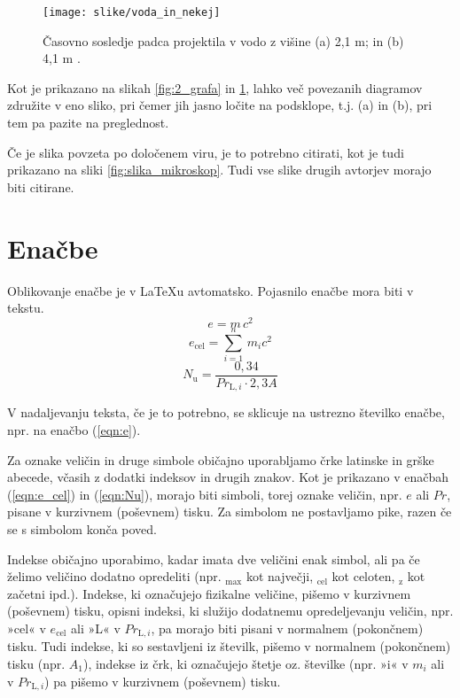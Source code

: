 \begin{figure}[ht!]
	\begin{centering}
		\texttt{[image: slike/voda\_in\_nekej]}
		\caption{Časovno sosledje padca projektila v vodo z višine (a) 2,1 m; in (b) 4,1 m \cite{bazant_1991}.} \label{fig:voda_in_nekej}
	\end{centering}
\end{figure}

Kot je prikazano na slikah \ref{fig:2_grafa} in \ref{fig:voda_in_nekej}, lahko več povezanih diagramov združite v eno sliko, pri čemer jih jasno ločite na podsklope, t.j. (a) in (b), pri tem pa pazite na preglednost.

Če je slika povzeta po določenem viru, je to potrebno citirati, kot je tudi prikazano na sliki \ref{fig:slika_mikroskop}. Tudi vse slike drugih avtorjev morajo biti citirane.

\section{Enačbe}\label{sec:enacbe}

Oblikovanje enačbe je v \LaTeX u avtomatsko. Pojasnilo enačbe mora biti v tekstu.
\begin{equation}\label{eqn:e}
e = m\,c^2
\end{equation}
\begin{equation}\label{eqn:e_cel}
e_{\text{cel}}=\sum_{i=1}^{n}\,m_{i}c^2
\end{equation}
\begin{equation}\label{eqn:Nu}
N_{\text{u}} = \frac{0{,}34}{Pr_{\text{L},i}\cdot 2{,}3A}
\end{equation}

V nadaljevanju teksta, če je to potrebno, se sklicuje na ustrezno številko enačbe, npr. na enačbo (\ref{eqn:e}).

Za oznake veličin in druge simbole običajno uporabljamo črke latinske in grške abecede, včasih z dodatki indeksov in drugih znakov. Kot je prikazano v enačbah (\ref{eqn:e_cel}) in (\ref{eqn:Nu}), morajo biti simboli, torej oznake veličin, npr. $e$ ali $Pr$, pisane v kurzivnem (poševnem) tisku. Za simbolom ne postavljamo pike, razen če se s simbolom konča poved.

Indekse običajno uporabimo, kadar imata dve veličini enak simbol, ali pa če želimo veličino dodatno opredeliti (npr. $_{\text{max}}$ kot največji, $_{\text{cel}}$ kot celoten, $_{\text{z}}$ kot začetni ipd.). Indekse, ki označujejo fizikalne veličine, pišemo v kurzivnem (poševnem) tisku, opisni indeksi, ki služijo dodatnemu opredeljevanju veličin, npr. »cel« v $e_{\text{cel}}$ ali »L« v $Pr_{\text{L},i}$, pa morajo biti pisani v normalnem (pokončnem) tisku. Tudi indekse, ki so sestavljeni iz številk, pišemo v normalnem (pokončnem) tisku (npr. $A_1$), indekse iz črk, ki označujejo štetje oz. številke (npr. »i« v $m_i$ ali v $Pr_{\text{L},i}$) pa pišemo v kurzivnem (poševnem) tisku.

